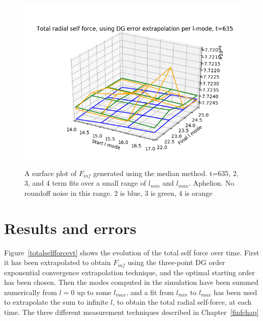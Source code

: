 \begin{figure}
  \includegraphics{bestfinflminlmax234termst635smallrange_perihelion}
  \caption{A surface plot of $F_{inf}$ generated using the median method. t=635, 2, 3, and 4 term fits over a small range of $l_{min}$ and $l_{max}$. Aphelion. No roundoff noise in this range. 2 is blue, 3 is green, 4 is orange}
  \label{surface234small}
\end{figure}



\section{Results and errors}

Figure~\ref{totalselfforcevt} shows the evolution of the total self force over time. First it has been extrapolated to obtain $F_{inf}$ using the three-point DG order exponential convergence extrapolation technique, and the optimal starting order has been chosen. Then the modes computed in the simulation have been summed numerically from $l=0$ up to some $l_{max}$, and a fit from $l_{min}$ to $l_{max}$ has been used to extrapolate the sum to infinite $l$, to obtain the total radial self-force, at each time. The three different measurement techniques described in Chapter~\ref{finfchap}


